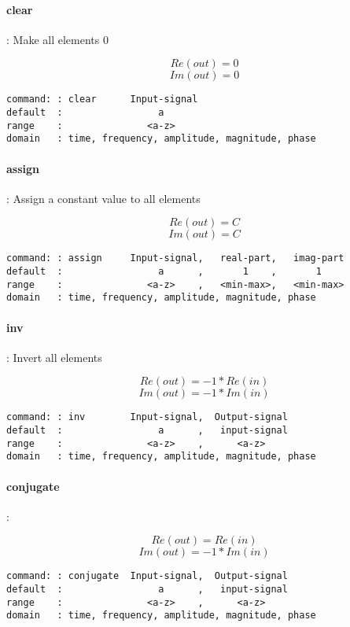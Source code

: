 \documentclass{report}
\newcommand{\bc}{\scriptsize}
\newcommand{\ec}{\normalsize}
\begin{document}
\paragraph{clear}: Make all elements 0

\[ Re(out) = 0 \]
\[ Im(out) = 0 \]

\bc
\begin{verbatim}
command: : clear      Input-signal
default  :                 a      
range    :               <a-z>    
domain   : time, frequency, amplitude, magnitude, phase
\end{verbatim}
\ec

\paragraph{assign}: Assign a constant value to all elements

\[ Re(out) = C \]
\[ Im(out) = C \]

\bc
\begin{verbatim}
command: : assign     Input-signal,   real-part,   imag-part
default  :                 a      ,       1    ,       1
range    :               <a-z>    ,   <min-max>,   <min-max>
domain   : time, frequency, amplitude, magnitude, phase
\end{verbatim}
\ec


\paragraph{inv}: Invert all elements

\[ Re(out) = -1*Re(in) \]
\[ Im(out) = -1*Im(in) \]

\bc
\begin{verbatim}
command: : inv        Input-signal,  Output-signal
default  :                 a      ,   input-signal  
range    :               <a-z>    ,      <a-z>
domain   : time, frequency, amplitude, magnitude, phase
\end{verbatim}
\ec

\paragraph{conjugate}: 

\[ Re(out) = Re(in) \]
\[ Im(out) = -1*Im(in) \]

\bc
\begin{verbatim}
command: : conjugate  Input-signal,  Output-signal
default  :                 a      ,   input-signal  
range    :               <a-z>    ,      <a-z>
domain   : time, frequency, amplitude, magnitude, phase
\end{verbatim}
\ec
\end{document}
